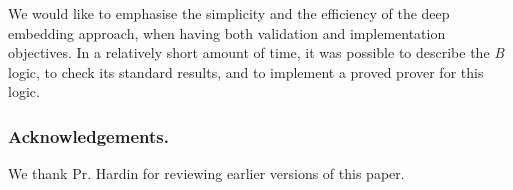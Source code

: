 \documentclass{llncs}
\begin{document}
We would like to emphasise the simplicity and the efficiency of the deep embedding approach, 
when having both validation and implementation objectives. In a relatively short amount of 
time, it was possible to describe the \emph{B} logic, to check its standard results, and to 
implement a proved prover for this logic.

\subsubsection*{\small Acknowledgements.}\label{sc_ack}\small We thank Pr. Hardin for 
reviewing earlier versions of this paper.







\end{document}
